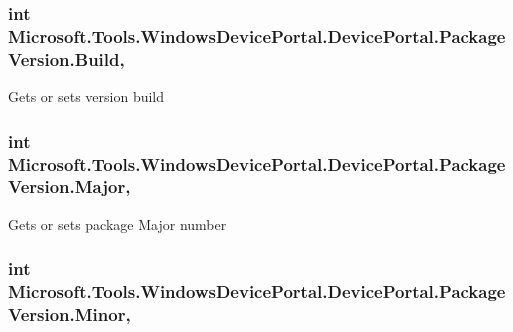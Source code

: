 \subsubsection[{\texorpdfstring{Build}{Build}}]{\setlength{\rightskip}{0pt plus 5cm}int Microsoft.\+Tools.\+Windows\+Device\+Portal.\+Device\+Portal.\+Package\+Version.\+Build\hspace{0.3cm}{\ttfamily [get]}, {\ttfamily [set]}}\hypertarget{class_microsoft_1_1_tools_1_1_windows_device_portal_1_1_device_portal_1_1_package_version_a8e9de8fc8070e2c3cb0722b2cf9c7060}{}\label{class_microsoft_1_1_tools_1_1_windows_device_portal_1_1_device_portal_1_1_package_version_a8e9de8fc8070e2c3cb0722b2cf9c7060}


Gets or sets version build 

\subsubsection[{\texorpdfstring{Major}{Major}}]{\setlength{\rightskip}{0pt plus 5cm}int Microsoft.\+Tools.\+Windows\+Device\+Portal.\+Device\+Portal.\+Package\+Version.\+Major\hspace{0.3cm}{\ttfamily [get]}, {\ttfamily [set]}}\hypertarget{class_microsoft_1_1_tools_1_1_windows_device_portal_1_1_device_portal_1_1_package_version_ace6f2a70e320feb403039a5a21c868b4}{}\label{class_microsoft_1_1_tools_1_1_windows_device_portal_1_1_device_portal_1_1_package_version_ace6f2a70e320feb403039a5a21c868b4}


Gets or sets package Major number 

\subsubsection[{\texorpdfstring{Minor}{Minor}}]{\setlength{\rightskip}{0pt plus 5cm}int Microsoft.\+Tools.\+Windows\+Device\+Portal.\+Device\+Portal.\+Package\+Version.\+Minor\hspace{0.3cm}{\ttfamily [get]}, {\ttfamily [set]}}\hypertarget{class_microsoft_1_1_tools_1_1_windows_device_portal_1_1_device_portal_1_1_package_version_ab6c31a0035501b46ddd4e5b1dc8a4e57}{}\label{class_microsoft_1_1_tools_1_1_windows_device_portal_1_1_device_portal_1_1_package_version_ab6c31a0035501b46ddd4e5b1dc8a4e57}


